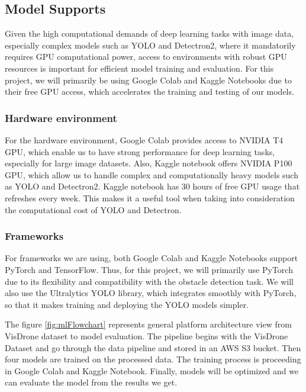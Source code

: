 \documentclass[stu,12pt,floatsintext]{apa7}
\begin{document}
\subsection{Model Supports}
Given the high computational demands of deep learning tasks with image data, especially complex models such as YOLO and Detectron2, where it mandatorily requires GPU computational power, access to environments with robust GPU resources is important for efficient model training and evaluation. For this project, we will primarily be using Google Colab and Kaggle Notebooks due to their free GPU access, which accelerates the training and testing of our models.


\subsubsection{Hardware environment}
For the hardware environment, Google Colab provides access to NVIDIA T4 GPU, which enable us to have strong performance for deep learning tasks, especially for large image datasets. Also, Kaggle notebook offers NVIDIA P100 GPU, which allow us to handle complex and computationally heavy models such as YOLO and Detectron2. Kaggle notebook has 30 hours of free GPU usage that refreshes every week. This makes it a useful tool when taking into consideration the computational cost of YOLO and Detectron.

\subsubsection{Frameworks}
For frameworks we are using, both Google Colab and Kaggle Notebooks support PyTorch and TensorFlow. Thus, for this project, we will primarily use PyTorch due to its flexibility and compatibility with the obstacle detection task. We will also use the Ultralytics YOLO library, which integrates smoothly with PyTorch, so that it makes training and deploying the YOLO models simpler.


The figure \ref{fig:mlFlowchart} represents general platform architecture view from VisDrone dataset to model evaluation. The pipeline begins with the VisDrone Dataset and go through the data pipeline and stored in an AWS S3 bucket. Then four models are trained on the processed data. The training process is proceeding in Google Colab and Kaggle Notebook. Finally, models will be optimized and we can evaluate the model from the results we get.
\end{document}
